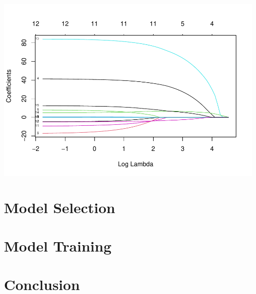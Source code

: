 \documentclass[
]{article}
\begin{document}
\includegraphics{Project_files/figure-latex/unnamed-chunk-28-1.pdf}

\hypertarget{model-selection}{%
\section{Model Selection}\label{model-selection}}

\hypertarget{model-training}{%
\section{Model Training}\label{model-training}}

\hypertarget{conclusion}{%
\section{Conclusion}\label{conclusion}}
\end{document}

